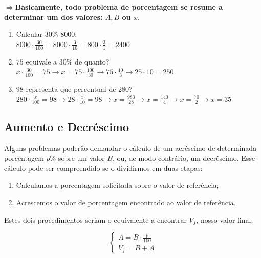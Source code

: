 \documentclass[12pt, a4paper, brazil]{abntex2}
\begin{document}
    $\Longrightarrow$\textbf{Basicamente, todo problema de porcentagem se resume a determinar um dos valores: $A, B$ ou $x$}.

    \begin{exemplo}
        \hfil\begin{enumerate}[label= (\alph*)]
            \item Calcular 30\% 8000:\\
                $
                \displaystyle 8000 \cdot \frac{30} {100} = 8000 \cdot \frac{3}{10} = 800 \cdot \frac{3}{1} = 2400
                $
            \item $75$ equivale a 30\% de quanto?\\
                $
                \displaystyle x \cdot \frac{30}{100} = 75 \rightarrow x = 75 \cdot \frac{100}{30} \rightarrow 75 \cdot \frac{10}{3} \rightarrow 25 \cdot 10 = 250 
                $
            \item $98$ representa que percentual de 280?\\
                $
                \displaystyle 280 \cdot \frac{x}{100} = 98 \rightarrow 28 \cdot \frac{x}{10} = 98 \rightarrow x = \frac{980}{28} \rightarrow x = \frac{140}{4} \rightarrow x = \frac{70}{2} \rightarrow x = 35
                $
        \end{enumerate}
    \end{exemplo}
    \bigskip


    \bigskip
    \subsection*{Aumento e Decréscimo}

    Alguns problemas poderão demandar o cálculo de um acréscimo de determinada porcentagem $p\%$ sobre um valor $B$, ou, de modo contrário, um decréscimo. Esse cálculo pode ser compreendido se o dividirmos em duas etapas:

    \begin{enumerate}
        \item Calculamos a porcentagem solicitada sobre o valor de referência;
        \item Acrescemos o valor de porcentagem encontrado ao valor de referência.
    \end{enumerate}

    Estes dois procedimentos seriam o equivalente a encontrar $V_f$, nosso valor final:

        \begin{equation}
           \begin{cases}
            A = B \cdot \displaystyle\frac{p}{100}\\
            V_f = B + A
           \end{cases} 
        \end{equation}
\end{document}
